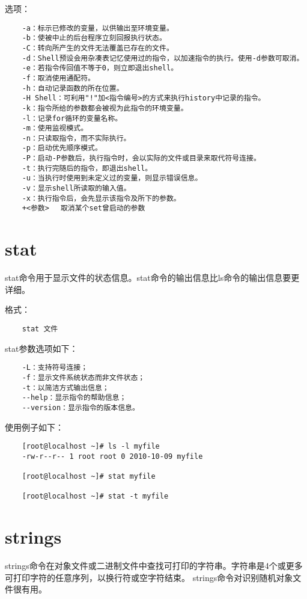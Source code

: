 \documentclass[a4paper,left=2.5cm,right=2.5cm,11pt]{article}
\begin{document}
	选项：
	\begin{lstlisting}
	-a：标示已修改的变量，以供输出至环境变量。 
	-b：使被中止的后台程序立刻回报执行状态。 
	-C：转向所产生的文件无法覆盖已存在的文件。 
	-d：Shell预设会用杂凑表记忆使用过的指令，以加速指令的执行。使用-d参数可取消。 
	-e：若指令传回值不等于0，则立即退出shell。 
	-f：取消使用通配符。 
	-h：自动记录函数的所在位置。 
	-H Shell：可利用"!"加<指令编号>的方式来执行history中记录的指令。 
	-k：指令所给的参数都会被视为此指令的环境变量。 
	-l：记录for循环的变量名称。 
	-m：使用监视模式。 
	-n：只读取指令，而不实际执行。 
	-p：启动优先顺序模式。 
	-P：启动-P参数后，执行指令时，会以实际的文件或目录来取代符号连接。 
	-t：执行完随后的指令，即退出shell。 
	-u：当执行时使用到未定义过的变量，则显示错误信息。 
	-v：显示shell所读取的输入值。 
	-x：执行指令后，会先显示该指令及所下的参数。
	+<参数> 　取消某个set曾启动的参数
	\end{lstlisting}

\section{stat}
	stat命令用于显示文件的状态信息。stat命令的输出信息比ls命令的输出信息要更详细。\par

	格式：
	\begin{lstlisting}
	stat 文件
	\end{lstlisting}

	stat参数选项如下：
	\begin{lstlisting}
	-L：支持符号连接； 
	-f：显示文件系统状态而非文件状态； 
	-t：以简洁方式输出信息； 
	--help：显示指令的帮助信息； 
	--version：显示指令的版本信息。
	\end{lstlisting}

	使用例子如下：
	\begin{lstlisting}
	[root@localhost ~]# ls -l myfile 
	-rw-r--r-- 1 root root 0 2010-10-09 myfile 

	[root@localhost ~]# stat myfile 
	
	[root@localhost ~]# stat -t myfile 
	\end{lstlisting}

\section{strings}
	strings命令在对象文件或二进制文件中查找可打印的字符串。字符串是4个或更多可打印字符的任意序列，以换行符或空字符结束。 strings命令对识别随机对象文件很有用。\par
\end{document}
